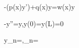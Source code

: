 -\left(p(x)y'\right)+q(x)y=\lambda w(x)y

-y''=\lambda y,\qquad y(0)=y(L)=0

y_n=\sin{},\qquad \lambda_n=
